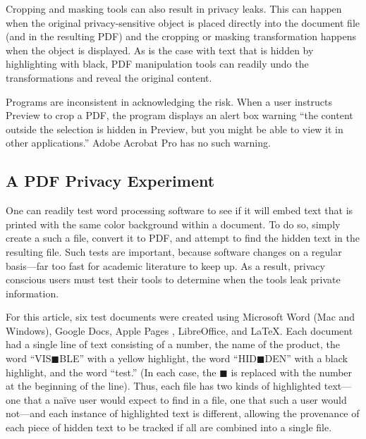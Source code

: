 Cropping and masking tools can also result in
privacy leaks. This can happen when the original privacy-sensitive
object is placed directly into the document file (and in the resulting
PDF) and the cropping or masking transformation happens when the
object is displayed. As is the case with text that is hidden by
highlighting with black, PDF manipulation tools can readily undo the
transformations and reveal the original content.

Programs are inconsistent in acknowledging the risk. When a user instructs Preview to crop a PDF, the program
displays an alert box warning ``the content outside the selection is
hidden in Preview, but you might be able to view it in other
applications.'' Adobe Acrobat Pro has no such warning.



\subsection{A PDF Privacy Experiment}
One can readily test word processing software to see if it will embed
text that is printed with the same color background within a
document. To do so, simply create a such a file, convert it to
PDF, and attempt to find the hidden text in the resulting file. Such
tests are important, because software changes on a regular basis---far
too fast for academic literature to keep up. As a result, privacy
conscious users must test their tools to
determine when the tools leak private
information.

For this article, six test documents were created using Microsoft Word
(Mac and Windows), Google Docs, Apple Pages , LibreOffice, and \LaTeX.
Each document had a single line of text consisting of a number, the
name of the product, the word ``VIS$\blacksquare$BLE'' with a yellow
highlight, the word ``HID$\blacksquare$DEN'' with a black
highlight, and the word ``test.'' (In each case, the
$\blacksquare$ is replaced with the number at the beginning of the line). Thus, each
file has two kinds of highlighted text---one that a na\"ive user would expect to find in
a file, one that such a user would not---and each instance of highlighted
text is different, allowing the provenance of each piece of hidden
text to be tracked if  all are combined into a single file. 

